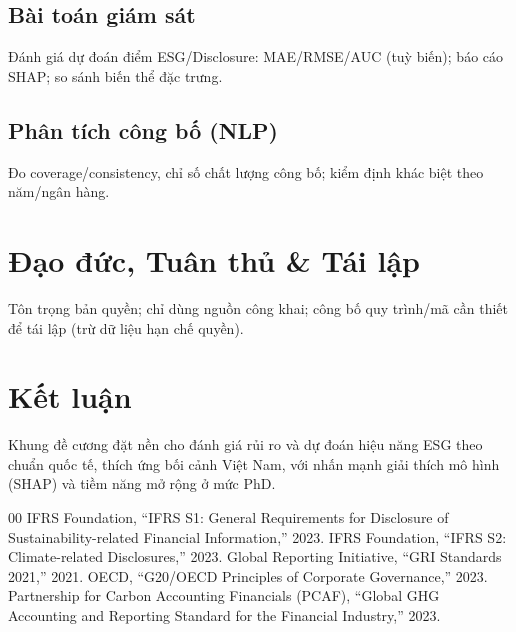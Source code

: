 \documentclass[conference]{IEEEtran}
\begin{document}
\subsection{Bài toán giám sát}
Đánh giá dự đoán điểm ESG/Disclosure: MAE/RMSE/AUC (tuỳ biến); báo cáo SHAP; so sánh biến thể đặc trưng.

\subsection{Phân tích công bố (NLP)}
Đo coverage/consistency, chỉ số chất lượng công bố; kiểm định khác biệt theo năm/ngân hàng.

\section{Đạo đức, Tuân thủ \& Tái lập}
Tôn trọng bản quyền; chỉ dùng nguồn công khai; công bố quy trình/mã cần thiết để tái lập (trừ dữ liệu hạn chế quyền).

\section{Kết luận}
Khung đề cương đặt nền cho đánh giá rủi ro và dự đoán hiệu năng ESG theo chuẩn quốc tế, thích ứng bối cảnh Việt Nam, với nhấn mạnh giải thích mô hình (SHAP) và tiềm năng mở rộng ở mức PhD.

\begin{thebibliography}{00}
 IFRS Foundation, ``IFRS S1: General Requirements for Disclosure of Sustainability-related Financial Information,'' 2023.
 IFRS Foundation, ``IFRS S2: Climate-related Disclosures,'' 2023.
 Global Reporting Initiative, ``GRI Standards 2021,'' 2021.
 OECD, ``G20/OECD Principles of Corporate Governance,'' 2023.
 Partnership for Carbon Accounting Financials (PCAF), ``Global GHG Accounting and Reporting Standard for the Financial Industry,'' 2023.
\end{thebibliography}
\end{document}
